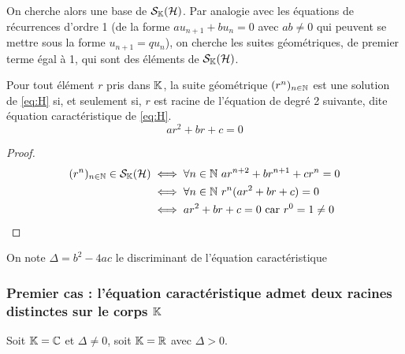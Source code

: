 On cherche alors une base de \(\mathcal{S}_{\mathbb{K}}(\mathcal{H})\). Par analogie avec les équations de récurrences d'ordre 1 (de la forme \(au_{n+1}+bu_n =0\) avec \(ab \neq 0\) qui peuvent se mettre sous la forme \(u_{n+1}=qu_n\)), on cherche les suites géométriques, de premier terme égal à 1, qui sont des éléments de \(\mathcal{S}_{\mathbb{K}}(\mathcal{H})\).

\begin{prop}
  Pour tout élément \(r\) pris dans \(\mathbb{K}\), la suite géométrique \((r^n)_{n \in \mathbb{N}}\) est une solution de \eqref{eq:H} si, et seulement si, \(r\) est racine de l'équation de degré 2 suivante, dite équation caractéristique de \eqref{eq:H}.
  \begin{equation}
    ar^2+br+c=0 \label{eq:EC} \tag{E.C.}
  \end{equation}
\end{prop}
\begin{proof}
  \begin{align}
    (r^n)_{n \in  \N} \in \S_\K(\H) &\iff \forall n \in \N \ ar^{n+2} +br^{n+1}+cr^n = 0 \\
                                    &\iff \forall n \in \N \ r^n(ar^2+br+c)=0\\
                                    &\iff ar^2+br+c=0 \text{~car } r^0=1 \neq 0
  \end{align}
\end{proof}

On note \(\Delta=b^2-4ac\) le discriminant de l'équation caractéristique

\subsubsection{Premier cas : l'équation caractéristique admet deux racines distinctes sur le corps \(\mathbb{K}\)}

Soit \(\mathbb{K}=\mathbb{C}\) et \(\Delta \neq 0\), soit \(\mathbb{K}=\mathbb{R}\) avec \(\Delta >0\).

